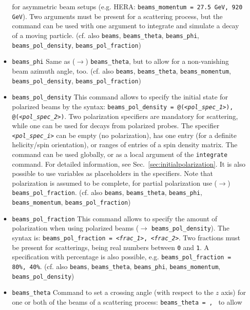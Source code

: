 \documentclass[12pt]{book}
\newcommand{\ttt}[1]{\texttt{#1}}
\begin{document}
\begin{itemize}
for asymmetric beam setups (e.g. HERA: \ttt{beams\_momentum = 27.5
  GeV, 920 GeV}). Two arguments must be present
for a scattering process, but the command can be used with one
argument to integrate and simulate a decay of a moving
particle. (cf. also \ttt{beams}, \ttt{beams\_theta},
\ttt{beams\_phi}, \ttt{beams\_pol\_density},
\ttt{beams\_pol\_fraction})
\item
\ttt{beams\_phi} \newline
Same as ($\to$) \ttt{beams\_theta}, but to allow for a non-vanishing
beam azimuth angle, too. (cf. also \ttt{beams}, \ttt{beams\_theta},
\ttt{beams\_momentum}, \ttt{beams\_pol\_density},
\ttt{beams\_pol\_fraction})
\item
\ttt{beams\_pol\_density} \newline
This command allows to specify the initial state for polarized beams
by the syntax: \ttt{beams\_pol\_density = @({\em <pol\_spec\_1>}),
  @({\em <pol\_spec\_2>})}. Two polarization specifiers are mandatory for
scattering, while one can be used for decays from polarized
probes. The specifier \ttt{{\em <pol\_spec\_i>}} can be empty (no
polarization), has one entry (for a definite helicity/spin
orientation), or ranges of entries of a spin density matrix. The
command can be used globally, or as a local argument of the
\ttt{integrate} command. For detailed information, see
Sec.~\ref{sec:initialpolarization}. It is also possible to use
variables as placeholders in the specifiers. Note that polarization is
assumed to be complete, for partial polarization use ($\to$)
\ttt{beams\_pol\_fraction}. (cf. also \ttt{beams}, \ttt{beams\_theta},
\ttt{beams\_phi}, \ttt{beams\_momentum}, \ttt{beams\_pol\_fraction})
\item
\ttt{beams\_pol\_fraction} \newline
This command allows to specify the amount of polarization when using
polarized beams ($\to$ \ttt{beams\_pol\_density}). The syntax is:
\ttt{beams\_pol\_fraction = {\em <frac\_1>}, {\em <frac\_2>}}. Two fractions must
be present for scatterings, being real numbers between \ttt{0} and
\ttt{1}. A specification with percentage is also possible,
e.g. \ttt{beams\_pol\_fraction = 80\%, 40\%}. (cf. also \ttt{beams},
\ttt{beams\_theta}, \ttt{beams\_phi}, \ttt{beams\_momentum},
\ttt{beams\_pol\_density})
\item
\ttt{beams\_theta} \newline
Command to set a crossing angle (with respect to the $z$ axis) for one
or both of the beams of a
scattering process: \ttt{beams\_theta = {\em <angle1>}, {\em <angle2>}} to allow

\end{itemize}
\end{document}
